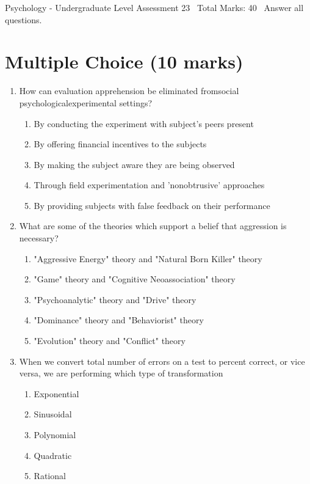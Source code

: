\documentclass[12pt]{article}
\begin{document}
\begin{center}
Psychology - Undergraduate Level Assessment 23 \
Total Marks: 40 \
Answer all questions.
\end{center}

\section*{Multiple Choice (10 marks)}
\begin{enumerate}[label=\arabic*.]
\item How can evaluation apprehension be eliminated fromsocial psychologicalexperimental settings?
\begin{enumerate}[label=(\alph*)]
    \item By conducting the experiment with subject's peers present
    \item By offering financial incentives to the subjects
    \item By making the subject aware they are being observed
    \item Through field experimentation and 'nonobtrusive' approaches
    \item By providing subjects with false feedback on their performance
\end{enumerate}
\item What are some of the theories which support a belief that aggression is necessary?
\begin{enumerate}[label=(\alph*)]
    \item "Aggressive Energy" theory and "Natural Born Killer" theory
    \item "Game" theory and "Cognitive Neoassociation" theory
    \item "Psychoanalytic" theory and "Drive" theory
    \item "Dominance" theory and "Behaviorist" theory
    \item "Evolution" theory and "Conflict" theory
\end{enumerate}
\item When we convert total number of errors on a test to percent correct, or vice versa, we are performing which type of transformation
\begin{enumerate}[label=(\alph*)]
    \item Exponential
    \item Sinusoidal
    \item Polynomial
    \item Quadratic
    \item Rational

\end{enumerate}
\end{enumerate}
\end{document}

